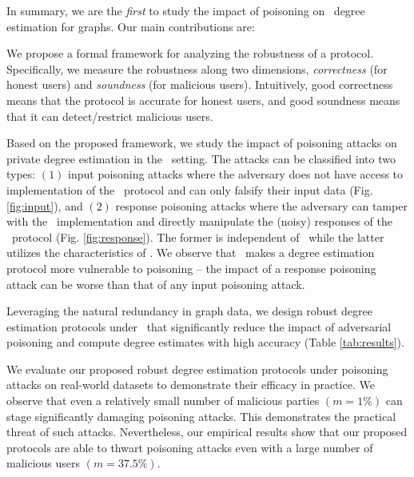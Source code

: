 In summary, we are the \textit{first} to study the impact of poisoning  on \ldp~degree estimation for graphs. Our main contributions are: 
\squishlist
    \item We propose a formal framework for analyzing the robustness of a protocol. %
Specifically, we measure the robustness along two dimensions, \textit{correctness} (for honest users) and \textit{soundness} (for malicious users). Intuitively, good correctness means that the protocol is accurate for honest users, and good soundness means that it can detect/restrict malicious users. %
\item Based on the proposed framework, we study the impact of poisoning attacks on private degree estimation in the \ldp~setting. The attacks can be classified into two types: $(1)$ input poisoning attacks  where the adversary does not have access to implementation of the \ldp~protocol and can only falsify their input data (Fig. \ref{fig:input}), and $(2)$ response poisoning attacks where the adversary can tamper with the \ldp~implementation and directly manipulate the (noisy) responses of the \ldp~protocol (Fig. \ref{fig:response}). The former is independent of \ldp~while the latter utilizes the characteristics of \ldp. We observe that \ldp~makes a degree estimation protocol more vulnerable to poisoning -- the impact of a response poisoning attack can be worse than that of any input poisoning attack. 
\item Leveraging the natural redundancy in graph data, we design robust degree estimation protocols under \ldp~that significantly reduce the impact of adversarial poisoning and compute degree estimates with high accuracy (Table \ref{tab:results}).
\item We evaluate our proposed robust degree estimation protocols under poisoning attacks on real-world datasets to demonstrate their efficacy in practice. We observe that even a relatively
small number of malicious parties $(m = 1\% )$ can stage significantly damaging poisoning attacks. This demonstrates the
practical threat of such attacks. Nevertheless, our empirical results show that our proposed protocols are
able to thwart poisoning attacks
even with a large number of malicious users $(m = 37.5\%)$.
\squishend



  



